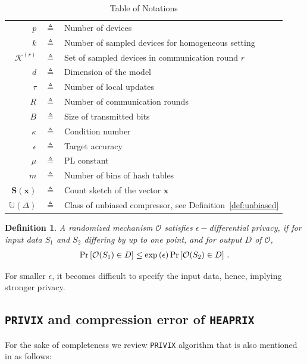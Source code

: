 \documentclass[twoside]{article}
\newtheorem{definition}{Definition}
\begin{document}
\begin{table}[htbp]\caption{Table of Notations}
\begin{center}%
\begin{tabular}{r c p{10cm} }
\toprule
$p$ & $\triangleq$ & Number of devices\\
$k$ & $\triangleq$ & Number of sampled devices for homogeneous setting\\
$\mathcal{K}^{(r)}$ & $\triangleq$ & Set of sampled devices in communication round $r$\\
$d$ & $\triangleq$ &  Dimension of the model \\
$\tau$ & $\triangleq$ & Number of local updates\\
$R$ & $\triangleq$ & Number of communication rounds\\
$B$ & $\triangleq$ &  Size of transmitted bits \\
$\kappa$ & $\triangleq$ & Condition number\\
$\epsilon$ & $\triangleq$ & Target accuracy\\
$\mu$ & $\triangleq$ & PL constant \\
$m$ & $\triangleq$ &  Number of bins of hash tables \\
 $\mathbf{S}(\boldsymbol{x})$  & $\triangleq$ &  Count sketch of the vector $\boldsymbol{x}$\\
 $\mathbb{U}(\Delta)$  & $\triangleq$ &  Class of unbiased compressor, see Definition~\ref{def:unbiased}\\
\bottomrule
\end{tabular}
\end{center}
\label{tab:notations}
\end{table}


 \begin{definition}
 A randomized mechanism $\mathcal{O}$ satisfies $\epsilon-$differential privacy, if for input data ${S}_1$ and ${S}_2$ differing by up to one point, and for output $D$ of $\mathcal{O}$,
 \begin{align}\notag
     \Pr\left[\mathcal{O}(S_1)\in D\right]\leq \exp{\left(\epsilon\right)}\Pr\left[\mathcal{O}(S_2)\in D\right] \, .
 \end{align}
 \end{definition}
  For smaller $\epsilon$, it becomes difficult to specify the input data, hence, implying stronger privacy.

\subsection{\texttt{PRIVIX} and compression error of \texttt{HEAPRIX}}
For the sake of completeness we review \texttt{PRIVIX} algorithm that is also mentioned in \cite{li2019privacy} as follows:
\end{document}
